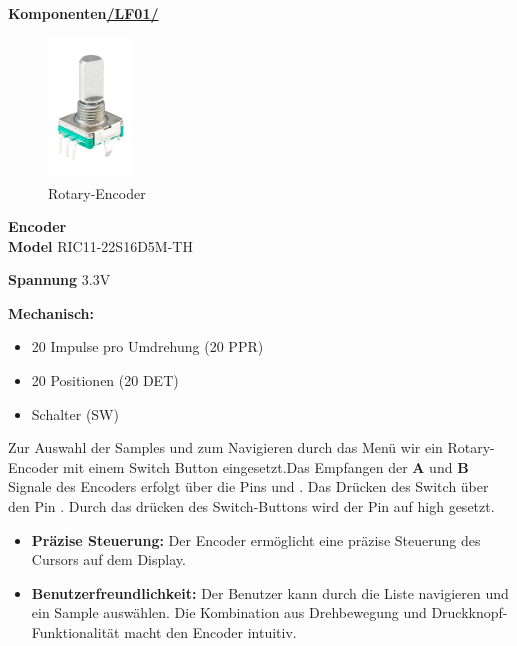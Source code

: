 
\textbf{Komponenten\hyperlink{LF01_Link}{/LF01/}} \\

\begin{figure} %
	\vspace{-60pt + 0.02\textwidth}
	\hspace{0.07\textwidth} %
	\includegraphics[width=0.2\textwidth]{images/05_technische_spezifikation/Interface/Encoder.png} %
	\caption{Rotary-Encoder}
	\label{fig:rotary_encoder}
	\vspace{-100pt}
\end{figure}

\textbf{\hypertarget{Encoder}{Encoder}} \\

\textbf{Model} RIC11-22S16D5M-TH

\textbf{Spannung} 3.3V

\textbf{Mechanisch:}
\begin{itemize}
	\item 20 Impulse pro Umdrehung (20 PPR)
	\item 20 Positionen (20 DET)
	\item Schalter (SW)
\end{itemize} 



Zur Auswahl der Samples und zum Navigieren durch das Menü wir ein Rotary-Encoder mit einem Switch Button eingesetzt.Das Empfangen der \textbf{A} und \textbf{B} Signale des Encoders erfolgt über die Pins  und .
Das Drücken des Switch über den Pin . Durch das drücken des Switch-Buttons wird der Pin  auf high gesetzt.

\begin{itemize}
	\item \textbf{Präzise Steuerung:} Der Encoder ermöglicht eine präzise Steuerung des Cursors auf dem Display.
	
	\item \textbf{Benutzerfreundlichkeit:} Der Benutzer kann durch die Liste navigieren und ein Sample auswählen. Die Kombination aus Drehbewegung und Druckknopf-Funktionalität macht den Encoder intuitiv.  
\end{itemize}

